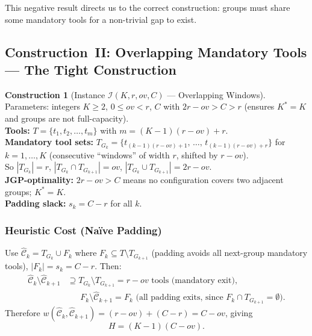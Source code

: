 \documentclass[11pt,a4paper]{article}
\theoremstyle{plain}
\theoremstyle{definition}
\newtheorem{construction}[theorem]{Construction}
\newcommand{\Heur}{H}               %
\newcommand{\Kstar}{K^{*}}          %
\newcommand{\sswitch}[2]{w(#1,#2)}  %
\begin{document}
This negative result directs us to the correct construction: groups must
share some mandatory tools for a non-trivial gap to exist.

\subsection{Construction~II: Overlapping Mandatory Tools --- The Tight Construction}
\label{sec:constII}

\begin{constructbox}
\begin{construction}[Instance $\mathcal{I}(K,r,\mathit{ov},C)$ --- Overlapping Windows]
\label{const:II}
Parameters: integers $K \ge 2$, $0 \le \mathit{ov} < r$, $C$
with $2r - \mathit{ov} > C > r$ (ensures $K^* = K$ and groups are not full-capacity).\\
\textbf{Tools:} $T = \{t_1, t_2, \ldots, t_m\}$ with $m = (K-1)(r-\mathit{ov}) + r$.\\
\textbf{Mandatory tool sets:}
$T_{G_k} = \{t_{(k-1)(r-\mathit{ov})+1},\, \ldots,\, t_{(k-1)(r-\mathit{ov})+r}\}$
for $k = 1,\ldots,K$ (consecutive ``windows'' of width $r$, shifted by $r - \mathit{ov}$).\\
So $|T_{G_k}| = r$, $|T_{G_k} \cap T_{G_{k+1}}| = \mathit{ov}$,
$|T_{G_k} \cup T_{G_{k+1}}| = 2r - \mathit{ov}$.\\
\textbf{JGP-optimality:} $2r - \mathit{ov} > C$ means no configuration covers two
adjacent groups; $\Kstar = K$.\\
\textbf{Padding slack:} $s_k = C - r$ for all $k$.
\end{construction}
\end{constructbox}

\subsubsection{Heuristic Cost (Naïve Padding)}

Use $\hat{\mathcal{C}}_k = T_{G_k} \cup F_k$ where $F_k \subseteq T \setminus T_{G_{k+1}}$
(padding avoids all next-group mandatory tools), $|F_k| = s_k = C - r$. Then:
\begin{align*}
  \hat{\mathcal{C}}_k \setminus \hat{\mathcal{C}}_{k+1}
  &\supseteq T_{G_k} \setminus T_{G_{k+1}} = r - \mathit{ov} \text{ tools (mandatory exit)},\\
  &\quad\;\; F_k \setminus \hat{\mathcal{C}}_{k+1} = F_k \text{ (all padding exits, since $F_k \cap T_{G_{k+1}} = \emptyset$)}.
\end{align*}
Therefore $\sswitch{\hat{\mathcal{C}}_k}{\hat{\mathcal{C}}_{k+1}} = (r-\mathit{ov}) + (C-r) = C - \mathit{ov}$, giving
\begin{equation}
  \boxed{\Heur = (K-1)(C - \mathit{ov}).}
  \label{eq:H}
\end{equation}
\end{document}

